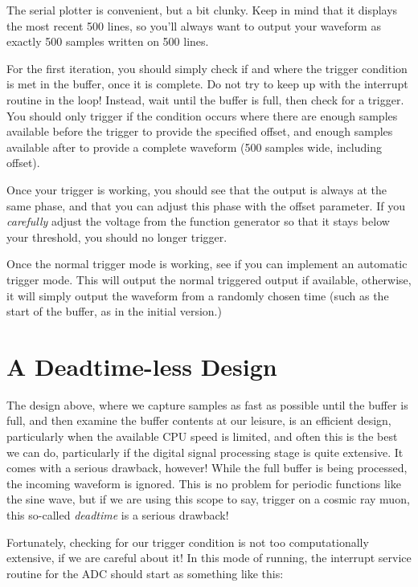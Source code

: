 \documentclass[12pt]{article}
\begin{document}
The serial plotter is convenient, but a bit clunky.  Keep in mind that it displays the most recent 500 lines, so you'll always want to output your waveform as exactly 500 samples written on 500 lines.

For the first iteration, you should simply check if and where the trigger condition is met in the buffer, once it is complete.  Do not try to keep up with the interrupt routine in the loop!  Instead, wait until the buffer is full, then check for a trigger.  You should only trigger if the condition occurs where there are enough samples available before the trigger to provide the specified offset, and enough samples available after to provide a complete waveform (500 samples wide, including offset).

Once your trigger is working, you should see that the output is always at the same phase, and that you can adjust this phase with the offset parameter.  If you {\em carefully} adjust the voltage from the function generator so that it stays below your threshold, you should no longer trigger.

Once the normal trigger mode is working, see if you can implement an automatic trigger mode.  This will output the normal triggered output if available, otherwise, it will simply output the waveform from a randomly chosen time (such as the start of the buffer, as in the initial version.)

\section{A Deadtime-less Design}

The design above, where we capture samples as fast as possible until the buffer is full, and then examine the buffer contents at our leisure, is an efficient design, particularly when the available CPU speed is limited, and often this is the best we can do, particularly if the digital signal processing stage is quite extensive.  It comes with a serious drawback, however!  While the full buffer is being processed, the incoming waveform is ignored.  This is no problem for periodic functions like the sine wave, but if we are using this scope to say, trigger on a cosmic ray muon, this so-called {\em deadtime} is a serious drawback!

Fortunately, checking for our trigger condition is not too computationally extensive, if we are careful about it!  In this mode of running, the interrupt service routine for the ADC should start as something like this:
\end{document}
